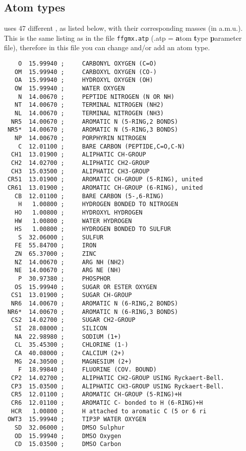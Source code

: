 \subsection{Atom types}
\label{subsec:atomtype}
{\gromacs} uses 47 different , 
as listed below, with their
corresponding masses (in a.m.u.). This is the same listing as in the
file \verb'ffgmx.atp' (.atp = {\bf a}tom {\bf t}ype {\bf p}arameter
file), therefore in this file you can change and/or add an atom type.
{\small\begin{verbatim}
    O  15.99940 ;     CARBONYL OXYGEN (C=O)              
   OM  15.99940 ;     CARBOXYL OXYGEN (CO-)              
   OA  15.99940 ;     HYDROXYL OXYGEN (OH)               
   OW  15.99940 ;     WATER OXYGEN                       
    N  14.00670 ;     PEPTIDE NITROGEN (N OR NH)         
   NT  14.00670 ;     TERMINAL NITROGEN (NH2)            
   NL  14.00670 ;     TERMINAL NITROGEN (NH3)            
  NR5  14.00670 ;     AROMATIC N (5-RING,2 BONDS)        
 NR5*  14.00670 ;     AROMATIC N (5-RING,3 BONDS)        
   NP  14.00670 ;     PORPHYRIN NITROGEN                 
    C  12.01100 ;     BARE CARBON (PEPTIDE,C=O,C-N)      
  CH1  13.01900 ;     ALIPHATIC CH-GROUP                 
  CH2  14.02700 ;     ALIPHATIC CH2-GROUP                
  CH3  15.03500 ;     ALIPHATIC CH3-GROUP                
 CR51  13.01900 ;     AROMATIC CH-GROUP (5-RING), united 
 CR61  13.01900 ;     AROMATIC CH-GROUP (6-RING), united 
   CB  12.01100 ;     BARE CARBON (5-,6-RING)            
    H   1.00800 ;     HYDROGEN BONDED TO NITROGEN        
   HO   1.00800 ;     HYDROXYL HYDROGEN                  
   HW   1.00800 ;     WATER HYDROGEN                     
   HS   1.00800 ;     HYDROGEN BONDED TO SULFUR          
    S  32.06000 ;     SULFUR                             
   FE  55.84700 ;     IRON                               
   ZN  65.37000 ;     ZINC                               
   NZ  14.00670 ;     ARG NH (NH2)                       
   NE  14.00670 ;     ARG NE (NH)                        
    P  30.97380 ;     PHOSPHOR                           
   OS  15.99940 ;     SUGAR OR ESTER OXYGEN              
  CS1  13.01900 ;     SUGAR CH-GROUP                     
  NR6  14.00670 ;     AROMATIC N (6-RING,2 BONDS)        
 NR6*  14.00670 ;     AROMATIC N (6-RING,3 BONDS)        
  CS2  14.02700 ;     SUGAR CH2-GROUP                    
   SI  28.08000 ;     SILICON                            
   NA  22.98980 ;     SODIUM (1+)                        
   CL  35.45300 ;     CHLORINE (1-)                      
   CA  40.08000 ;     CALCIUM (2+)                       
   MG  24.30500 ;     MAGNESIUM (2+)                     
    F  18.99840 ;     FLUORINE (COV. BOUND)              
  CP2  14.02700 ;     ALIPHATIC CH2-GROUP USING Ryckaert-Bell.
  CP3  15.03500 ;     ALIPHATIC CH3-GROUP USING Ryckaert-Bell.
  CR5  12.01100 ;     AROMATIC CH-GROUP (5-RING)+H       
  CR6  12.01100 ;     AROMATIC C- bonded to H (6-RING)+H 
  HCR   1.00800 ;     H attached to aromatic C (5 or 6 ri
 OWT3  15.99940 ;     TIP3P WATER OXYGEN                 
   SD  32.06000 ;     DMSO Sulphur                       
   OD  15.99940 ;     DMSO Oxygen                        
   CD  15.03500 ;     DMSO Carbon                        
\end{verbatim}}

